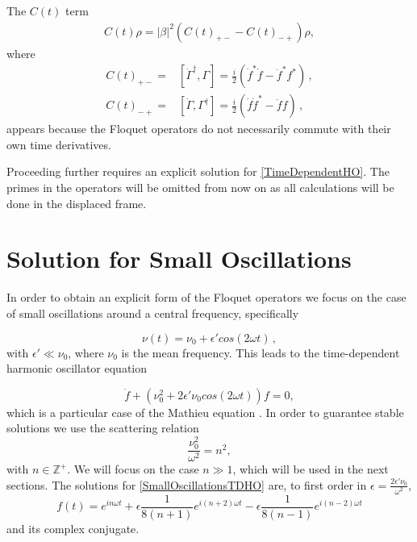 \documentclass[reprint, amsmath,amssymb, aps,pra]{revtex4-1}
\begin{document}
The $C(t)$ term
 \begin{align}
C(t)\rho = |\beta|^2(C(t)_{+-} - C(t)_{-+})\rho \nonumber,
 \end{align}
 where
\begin{align*}
C(t)_{+-} =& [\dot{\Gamma}^{\dagger}, \Gamma]=\frac{i}{2}(\dot{f}^*
             \dot{f} - \ddot{f}^*f^*)\, ,\\
C(t)_{-+} =& [\dot{\Gamma}, \Gamma^{\dagger}]=\frac{i}{2}(\dot{f}
             \dot{f}^* - \ddot{f}f)\,,
\end{align*}
appears because the Floquet operators do not necessarily commute with
their own time derivatives.

Proceeding further requires an explicit solution for
\eqref{TimeDependentHO}. The primes in the operators will be omitted
from now on as all calculations will be done in the displaced frame.


\section{Solution for Small Oscillations}\label{SolSmallOsc}
 
In order to obtain an explicit form of the Floquet operators we focus
on the case of small oscillations around a central frequency,
specifically

\begin{equation}
\nu(t) = \nu_0 + \epsilon' cos(2\omega t)\, ,
\end{equation}
with $\epsilon' \ll \nu_0$, where $\nu_0$ is the mean frequency. This
leads to the time-dependent harmonic oscillator equation

\begin{equation}\label{SmallOscillationsTDHO}
\ddot{f} + (\nu_0^2 + 2\epsilon' \nu_0 cos(2\omega t))f = 0,
\end{equation}
which is a particular case of the Mathieu equation \cite{PiatekME}.
In order to guarantee stable solutions we use the scattering
relation
\begin{equation}
\frac{\nu_0^2}{\omega^2} = n^2,\label{scattering}
\end{equation}
with $n \in \mathbb{Z}^+$\cite{WardFT}. We will focus on the case
$n\gg 1$, which will be used in the next sections. The solutions for
\eqref{SmallOscillationsTDHO} are, to first order in
$\epsilon= \frac{2\epsilon' \nu_0}{\omega^2}$,
\begin{equation}\label{SmallOscillationsSolution}
f(t)=  e^{in\omega t}  + \epsilon \frac{1}{8(n+1)} e^{i(n+2)\omega t} - \epsilon \frac{1}{8(n-1)} e^{i(n-2)\omega t}
\end{equation} and its complex conjugate.
\end{document}
